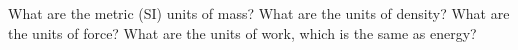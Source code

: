 What are the metric (SI) units of mass?  What are the units of density?  What are the units of force?  What are the units of work, which is the same as energy?
